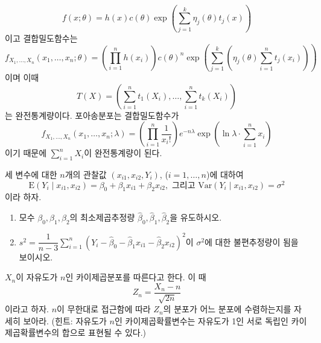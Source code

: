 \documentclass[answers]{exam}
\begin{document}
\begin{questions}
\begin{solution}
\begin{enumerate}
\begin{itemize}
        $$
          f\left(x;\theta\right) = h\left(x\right)c\left(\theta\right)\exp\left(\sum_{j=1}^{k}\eta_{j}\left(\theta\right)t_{j}\left(x\right)\right)
        $$
        이고 결합밀도함수는
        $$
          f_{X_{1},\ldots,X_{n}}\left(x_{1},\ldots,x_{n};\theta\right)= \left(\prod_{i=1}^{n}h\left(x_{i}\right)\right)c\left(\theta\right)^{n}\exp\left(\sum_{j=1}^{k}\left(\eta_{j}\left(\theta\right)\sum_{i=1}^{n}t_{j}\left(x_{i}\right)\right)\right)
        $$
        이며 이때
        $$
          T\left(X\right)=\left(\sum_{i=1}^{n}t_{1}\left(X_{i}\right),\ldots,\sum_{i=1}^{n}t_{k}\left(X_{i}\right)\right)
        $$
        는 완전통계량이다. 포아송분포는 결합밀도함수가
        \begin{equation}
          f_{X_{1},\ldots,X_{n}}\left(x_{1},\ldots,x_{n};\lambda\right) = \left(\prod_{i=1}^{n}\dfrac{1}{x_{i}!}\right)e^{-n\lambda}\exp\left(\ln \lambda \cdot \sum_{i=1}^{n}x_{i}\right)
        \end{equation}
        이기 때문에 $\sum_{i=1}^{n}X_{i}$이 완전통계량이 된다.
      \end{itemize}
    \end{enumerate}
   \end{solution}
   \question
   세 변수에 대한 $n$개의 관찰값 $\left(x_{i1},x_{i2},Y_{i}\right)$, ($i=1,\ldots,n$)에 대하여
   $$
    \mathrm{E}\left(Y_{i}\;|\;x_{i1},x_{i2}\right)=\beta_{0}+\beta_{1}x_{i1}+\beta_{2}x_{i2},\text{ 그리고 } \mathrm{Var}\left(Y_{i}\;|\;x_{i1},x_{i2}\right)=\sigma^{2}
   $$
   이라 하자.
   \begin{enumerate}
    \item 모수 $\beta_{0}, \beta_{1},\beta_{2}$의 최소제곱추정량 $\widehat{\beta}_{0},\widehat{\beta}_{1},\widehat{\beta}_{2}$을 유도하시오.
    \item $s^{2}=\dfrac{1}{n-3}\displaystyle\sum_{i=1}^{n}\left(Y_{i}-\widehat{\beta}_{0}-\widehat{\beta}_{1}x_{i1}-\widehat{\beta}_{2}x_{i2}\right)^{2}$이 $\sigma^{2}$에 대한 불편추정량이 됨을 보이시오.
   \end{enumerate}
   \begin{solution}

   \end{solution}
   \question
   $X_{n}$이 자유도가 $n$인 카이제곱분포를 따른다고 한다. 이 때
   $$
    Z_{n}=\dfrac{X_{n}-n}{\sqrt{2n}}
   $$
   이라고 하자. $n$이 무한대로 접근함에 따라 $Z_{n}$의 분포가 어느 분포에 수렴하는지를 자세히 보아라. (힌트: 자유도가 $n$인 카이제곱확률변수는 자유도가 1인 서로 독립인 카이제곱확률변수의 합으로 표현될 수 있다.)
\end{questions}
\end{document}
